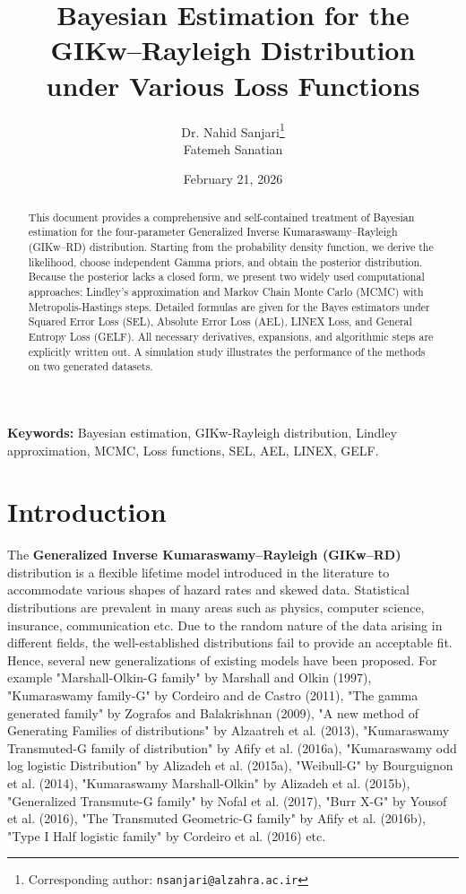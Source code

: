 \documentclass[12pt]{article}
\title{Bayesian Estimation for the GIKw--Rayleigh Distribution\\
under Various Loss Functions}
\author{Dr. Nahid Sanjari\thanks{Corresponding author: \texttt{nsanjari@alzahra.ac.ir}} \\ Fatemeh Sanatian}
\date{February 21, 2026}
\begin{document}
\maketitle



\begin{abstract}
This document provides a comprehensive and self-contained treatment of Bayesian
estimation for the four-parameter Generalized Inverse Kumaraswamy–Rayleigh (GIKw–RD)
distribution. Starting from the probability density function, we derive the likelihood,
choose independent Gamma priors, and obtain the posterior distribution. Because
the posterior lacks a closed form, we present two widely used computational approaches:
Lindley's approximation and Markov Chain Monte Carlo (MCMC) with Metropolis-Hastings
steps. Detailed formulas are given for the Bayes estimators under Squared Error Loss
(SEL), Absolute Error Loss (AEL), LINEX Loss, and General Entropy Loss (GELF).
All necessary derivatives, expansions, and algorithmic steps are explicitly written out.
A simulation study illustrates the performance of the methods on two generated datasets.
\end{abstract}



\noindent\textbf{Keywords:} Bayesian estimation, GIKw-Rayleigh distribution,
Lindley approximation, MCMC, Loss functions, SEL, AEL, LINEX, GELF.



\section{Introduction}



The \textbf{Generalized Inverse Kumaraswamy–Rayleigh (GIKw–RD)} distribution is a
flexible lifetime model introduced in the literature to accommodate various shapes
of hazard rates and skewed data. Statistical distributions are prevalent in many
areas such as physics, computer science, insurance, communication etc. Due to the
random nature of the data arising in different fields, the well-established
distributions fail to provide an acceptable fit. Hence, several new generalizations
of existing models have been proposed. For example "Marshall-Olkin-G family" by
Marshall and Olkin (1997), "Kumaraswamy family-G" by Cordeiro and de Castro (2011),
"The gamma generated family" by Zografos and Balakrishnan (2009), "A new method of
Generating Families of distributions" by Alzaatreh et al. (2013), "Kumaraswamy
Transmuted-G family of distribution" by Afify et al. (2016a), "Kumaraswamy odd log
logistic Distribution" by Alizadeh et al. (2015a), "Weibull-G" by Bourguignon et al.
(2014), "Kumaraswamy Marshall-Olkin" by Alizadeh et al. (2015b), "Generalized
Transmute-G family" by Nofal et al. (2017), "Burr X-G" by Yousof et al. (2016),
"The Transmuted Geometric-G family" by Afify et al. (2016b), "Type I Half logistic
family" by Cordeiro et al. (2016) etc.
\end{document}
